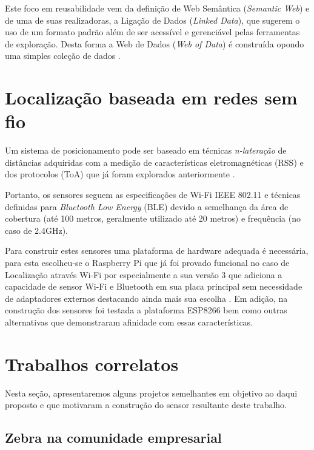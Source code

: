 Este foco em reusabilidade vem da definição de Web Semântica (\emph{Semantic
Web}) e de uma de suas realizadoras, a Ligação de Dados (\emph{Linked Data}),
que sugerem o uso de um formato padrão além de ser acessível e gerenciável pelas
ferramentas de exploração. Desta forma a Web de Dados (\emph{Web of Data}) é
construída opondo uma simples coleção de dados \cite{Bizer2009}.

\section{Localização baseada em redes sem fio}
\label{sec:Localização baseada em redes sem fio}

Um sistema de posicionamento pode ser baseado em técnicas
\emph{n-lateração} de distâncias adquiridas com a medição de características
eletromagnéticas (RSS) e dos protocolos (ToA) que já foram explorados anteriormente \cite{Abusubaih2007,
bahillo2009ieee, Feldmann2003}.

Portanto, os sensores seguem as especificações de Wi-Fi IEEE 802.11
\cite{Crow1997} e técnicas definidas para \emph{Bluetooth Low Energy} (BLE)
\cite{Hossain2007} devido a semelhança da área de cobertura (até 100 metros,
geralmente utilizado até 20 metros) e frequência (no caso de 2.4GHz).

Para construir estes sensores uma plataforma de hardware adequada é necessária,
para esta escolheu-se o Raspberry Pi \cite{Vujovic2014, Vujovic2015} que já
foi provado funcional no caso de Localização através Wi-Fi por
 especialmente a sua versão 3 que adiciona a capacidade
de sensor Wi-Fi e Bluetooth em sua placa principal sem
necessidade de adaptadores externos destacando ainda mais sua escolha
\cite{RPI2016}. Em adição, na construção dos sensores foi testada a plataforma ESP8266 bem como
outras alternativas que demonstraram afinidade com essas características.


\section{Trabalhos correlatos}
\label{Trabalhos correlatos}
Nesta seção, apresentaremos alguns projetos semelhantes em objetivo ao daqui
proposto e que motivaram a construção do sensor resultante deste trabalho.

\subsection{Zebra na comunidade empresarial}
\label{subsec:Zebra na comunidade empresarial}

